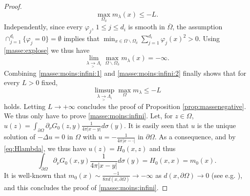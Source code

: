 \documentclass[10pt]{amsart}
\numberwithin{equation}{section}
\newcommand{\vp}{\varphi}
\newcommand{\Om}{\Omega}
\theoremstyle{plain}
\theoremstyle{remark}
\begin{document}
\begin{proof}
\begin{equation} \label{masse:moins:infini:1}
\max_{\Om_\delta} m_\lambda(x) \le - L .
\end{equation}
Independently, since every $\vp_j$, $1 \le j \le d_i$ is smooth in $\overline{\Om}$, the assumption $\cap_{j=1}^{d_i} \{\vp_j = 0 \} = \emptyset$ implies that $\min_{x \in \Om \backslash \Om_\delta} \sum_{j=1}^{d_i} \vp_j(x)^2 >0$. Using \eqref{masse:explose} we thus have 
\begin{equation} \label{masse:moins:infini:2}
\lim_{ \lambda \underset{> }{\to} \Lambda_{i}} \max_{\Om \backslash \Om_\delta} m_\lambda(x)  = - \infty. 
\end{equation}
Combining \eqref{masse:moins:infini:1} and \eqref{masse:moins:infini:2} finally shows that for every $L >0$ fixed,
$$\limsup_{\lambda \underset{> }{\to} \Lambda_{i} } \max_{\Om} m_{\lambda} \le - L$$
holds. Letting $L \to + \infty$ concludes the proof of Proposition \ref{prop:massenegative}. We thus only have to prove \eqref{masse:moins:infini}. Let, for $z \in \Om$, $u(z) = \int_{\partial \Om} \partial_\nu G_0(z,y) \frac{1}{4 \pi |x-y|} d \sigma(y)$. It is easily seen that $u$ is the unique solution of $-\Delta u =0$ in $\Om$ with $u = - \frac{1}{4\pi |x-\cdot|}$ in $\partial \Om$. As a consequence, and by \eqref{eq:Hlambda}, we thus have $u(z) = H_0(x,z)$ and thus
$$ \int_{\partial \Om} \partial_\nu G_0(x,y) \frac{1}{4 \pi |x-y|} d \sigma(y) = H_0(x,x) = m_0(x). $$
It is well-known that $m_0(x) \sim \frac{-1}{8\pi d(x, \partial \Om)} \to - \infty$ as $d(x, \partial \Om) \to 0$ (see e.g. \cite[Equation (2.8)]{Rey}), and this concludes the proof of \eqref{masse:moins:infini}.
\end{proof}
\end{document}
